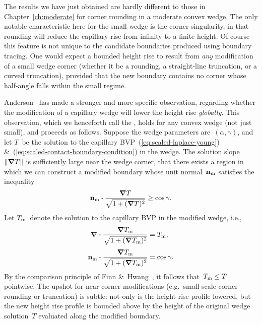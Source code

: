 The results we have just obtained
are hardly different to those in Chapter~\ref{ch:moderate}
for corner rounding in a moderate convex wedge.
The only notable characteristic here for the small wedge
is the corner singularity,
in that rounding will reduce the capillary rise
from infinity to a finite height.
Of course this feature is not unique to the candidate boundaries
produced using boundary tracing.
One would expect a bounded height rise to result from
\emph{any} modification of a small wedge corner
(whether it be a rounding, a straight-line truncation, or a curved truncation),
provided that the new boundary contains no corner
whose half-angle falls within the small regime.

Anderson~\cite[Section~7.3.2]{anderson-2002-thesis-boundary-tracing-pdes}
has made a stronger and more specific observation,
regarding whether the modification of a capillary wedge
will lower the height rise \emph{globally}.
This observation,
which we henceforth call the ,
holds for any convex wedge (not just small),
and proceeds as follows.
Suppose the wedge parameters are~$(\alpha, \gamma)$,
and let $T$~be the solution
to the capillary BVP~(\ref{eq:scaled-laplace-young})
\&~(\ref{eq:scaled-contact-boundary-condition})
in the wedge.
The solution slope~$\lVert\mathop{}\!\boldsymbol{\mathbf{\nabla}} T\rVert$
is sufficiently large near the wedge corner,
that there exists a region in which we can construct a modified boundary
whose unit normal~$\mathop{}\!\boldsymbol{\mathbf{n}}_{\mathrm{m}}$ satisfies the inequality
\begin{equation}
  \mathop{}\!\boldsymbol{\mathbf{n}}_{\mathrm{m}} \boldsymbol{\cdot} \frac{\mathop{}\!\boldsymbol{\mathbf{\nabla}} T}{\sqrt{1 + (\mathop{}\!\boldsymbol{\mathbf{\nabla}} T)^2}} \ge \cos\gamma.
  \label{eq:modification-contact-boundary-condition-inequality}
\end{equation}
Let $T_{\mathrm{m}}$~denote the solution to the capillary BVP
in the modified wedge,
i.e.,
\begin{align}
  \del \dotp \frac{\del T_\modi}{\sqrt{1 + (\del T_\modi)^2}}
    &= T_\modi,
    \label{eq:modification-laplace-young}
    \\[\tallspace]
  \normalvec_\modi \dotp \frac{\del T_\modi}{\sqrt{1 + (\del T_\modi)^2}}
    &= \cos\gamma.
    \label{eq:modification-contact-boundary-condition}
\end{align}
By the comparison principle
of Finn \&~Hwang~\cite{finn-1989-comparison-principle-capillary-surfaces},
it follows that~$T_{\mathrm{m}} \le T$ pointwise.
The upshot for near-corner modifications
(e.g.~small-scale corner rounding or truncation)
is subtle:
not only is the height rise profile lowered,
but the new height rise profile is bounded above
by the height of the original wedge solution~$T$
evaluated along the modified boundary.

